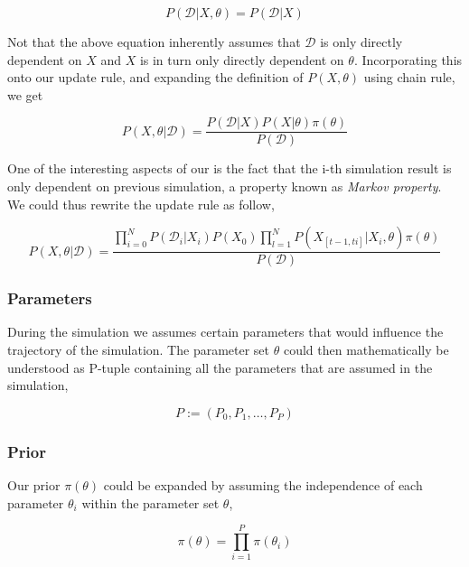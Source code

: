 \documentclass{bioinfo}
\begin{document}
\begin{equation}
P(\mathcal{D} | X, \theta) = P(\mathcal{D} | X)\label{eq:05}
\end{equation}

Not that the above equation inherently assumes that $\mathcal{D}$ is only directly dependent on $X$ and $X$ is in turn only directly dependent on $\theta$. Incorporating this onto our update rule, and expanding the definition of $P(X, \theta)$ using chain rule, we get

\begin{equation}
P(X, \theta | \mathcal{D}) = \frac{P(\mathcal{D} | X)  P(X | \theta) \pi(\theta)}{P(\mathcal{D})}\label{eq:06}
\end{equation}

One of the interesting aspects of our is the fact that the i-th simulation result is only dependent on previous simulation, a property known as \textit{Markov property}. We could thus rewrite the update rule as follow,


\begin{equation}
P(X, \theta | \mathcal{D}) = \frac{\prod_{i=0}^{N} P(\mathcal{D}_i | X_i) P(X_0) \prod_{l=1}^{N} P(X_{[t-1, ti]} | X_i, \theta)\pi(\theta)}{P(\mathcal{D})}\label{eq:07}
\end{equation}

\subsubsection{Parameters}

During the simulation we assumes certain parameters that would influence the trajectory of the simulation. The parameter set $\theta$ could then mathematically be understood as P-tuple containing all the parameters that are assumed in the simulation,

\begin{equation}
P := (P_0, P_1, \dots , P_P)\label{eq:08}
\end{equation}

\subsubsection{Prior}

Our prior $\pi(\theta)$ could be expanded by assuming the independence of each parameter $\theta_i$ within the parameter set $\theta$,

\begin{equation}
\pi(\theta) = \prod_{i=1}^{P} \pi(\theta_i)\label{eq:09}
\end{equation}
\end{document}
